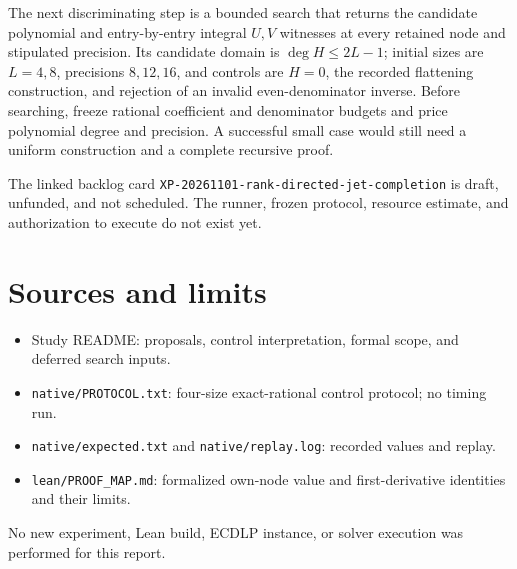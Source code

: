 \documentclass[10pt]{article}
\begin{document}
The next discriminating step is a bounded search that returns the candidate polynomial and entry-by-entry integral $U,V$ witnesses at every retained node and stipulated precision. Its candidate domain is $\deg H\leq 2L-1$; initial sizes are $L=4,8$, precisions $8,12,16$, and controls are $H=0$, the recorded flattening construction, and rejection of an invalid even-denominator inverse. Before searching, freeze rational coefficient and denominator budgets and price polynomial degree and precision. A successful small case would still need a uniform construction and a complete recursive proof.

The linked backlog card \texttt{XP-20261101-rank-directed-jet-completion} is draft, unfunded, and not scheduled. The runner, frozen protocol, resource estimate, and authorization to execute do not exist yet.
\section*{Sources and limits}
\begin{itemize}
\item Study README: proposals, control interpretation, formal scope, and deferred search inputs.
\item \texttt{native/PROTOCOL.txt}: four-size exact-rational control protocol; no timing run.
\item \texttt{native/expected.txt} and \texttt{native/replay.log}: recorded values and replay.
\item \texttt{lean/PROOF\_MAP.md}: formalized own-node value and first-derivative identities and their limits.
\end{itemize}
No new experiment, Lean build, ECDLP instance, or solver execution was performed for this report.
\end{document}
